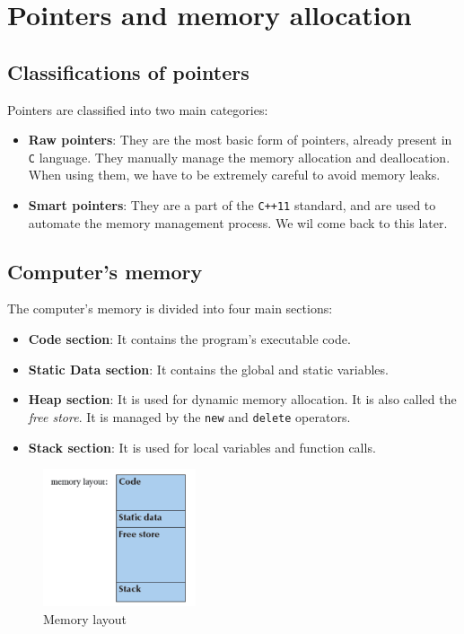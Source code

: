 \chapter{Pointers and memory allocation}

\section{Classifications of pointers}

Pointers are classified into two main categories:

\begin{itemize}
    \item \textbf{Raw pointers}: They are the most basic form of pointers, already present in \texttt{C} language. 
    They manually manage the memory allocation and deallocation.
    When using them, we have to be extremely careful to avoid memory leaks.
    \item \textbf{Smart pointers}: They are a part of the \texttt{C++11} standard, and are used to automate the memory management process.
    We wil come back to this later.
\end{itemize}

\section{Computer's memory}

The computer's memory is divided into four main sections:

\begin{itemize}
    \item \textbf{Code section}: It contains the program's executable code.
    \item \textbf{Static Data section}: It contains the global and static variables.
    \item \textbf{Heap section}: It is used for dynamic memory allocation. It is also called the \textit{free store}. It is
    managed by the \texttt{new} and \texttt{delete} operators.
    \item \textbf{Stack section}: It is used for local variables and function calls.
\end{itemize}

\begin{figure}[ht]
    \centering
    \includegraphics[width=4.5cm]{figures/image_memory.png}
    \caption{Memory layout}
    \label{fig:memory}
\end{figure}

